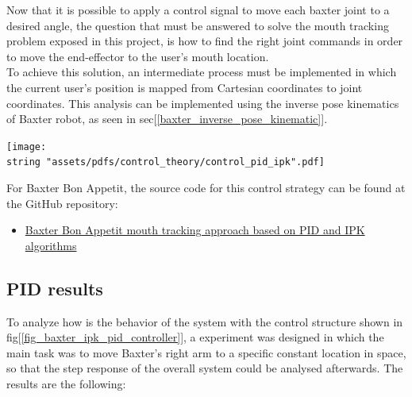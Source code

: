 \documentclass[11pt]{report} %
\begin{document}
Now that it is possible to apply a control signal to move each baxter joint to a desired angle, the question that must be answered to solve the mouth tracking problem exposed in this project, is how to find the right joint commands in order to move the end-effector to the user's mouth location.\\

To achieve this solution, an intermediate process must be implemented in which the current user's position is mapped from Cartesian coordinates to joint coordinates. This analysis can be implemented using the inverse pose kinematics of Baxter robot, as seen in sec[\ref{baxter_inverse_pose_kinematic}]. \\

\begin{center}
\texttt{[image: \\string "assets/pdfs/control\_theory/control\_pid\_ipk".pdf]}
\bigbreak
\begin{minipage}{\linewidth} %
\label{fig_baxter_ipk_pid_controller}
\end{minipage} \end{center}

For Baxter Bon Appetit, the source code for this control strategy can be found at the GitHub repository:

\begin{itemize}
    \color{blue}
    \item \href{https://github.com/san99tiago/baxter-bon-appetit/blob/main/python/baxter_bon_appetit/scripts/node_open_loop_control_trajectory.py}{Baxter Bon Appetit mouth tracking approach based on PID and IPK algorithms}
\end{itemize}

\subsection{PID results}
To analyze how is the behavior of the system with the control structure shown in fig[\ref{fig_baxter_ipk_pid_controller}], a experiment was designed in which the main task was to move Baxter's right arm to a specific constant location in space, so that the step response of the overall system could be analysed afterwards. The results are the following:
\end{document}
